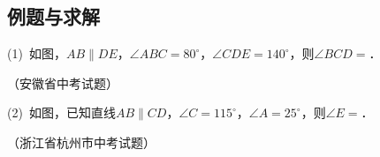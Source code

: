 \documentclass[a4paper]{ctexart}
\begin{document}
    \subsection*{例题与求解}
    \begin{asparaenum}[\heiti 【例 1】]
        \item (1)\, 如图，$AB\parallel DE$，$\angle ABC=80^{\circ}$，$\angle CDE=140^{\circ}$，则$\angle BCD=$\underline{\hspace{5\ccwd}}．
            \begin{flushright}
                \kaishu （安徽省中考试题）
            \end{flushright}
            \hspace{6.4\ccwd}(2)\, 如图，已知直线$AB\parallel CD$，$\angle C=115^{\circ}$，$\angle A=25^{\circ}$，则$\angle E=$\underline{\hspace{5\ccwd}}．
            \begin{flushright}
                \kaishu （浙江省杭州市中考试题）
            \end{flushright}
        


\end{asparaenum}
\end{document}
